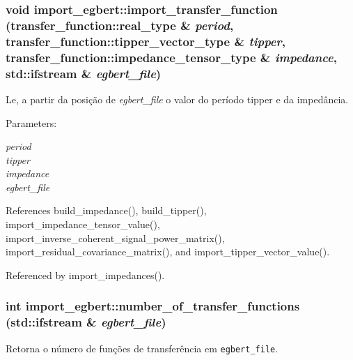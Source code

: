 \subsubsection{\setlength{\rightskip}{0pt plus 5cm}void import\_\-egbert::import\_\-transfer\_\-function ({\bf transfer\_\-function::real\_\-type} \& {\em period}, \/  transfer\_\-function::tipper\_\-vector\_\-type \& {\em tipper}, \/  transfer\_\-function::impedance\_\-tensor\_\-type \& {\em impedance}, \/  std::ifstream \& {\em egbert\_\-file})}\label{namespaceimport__egbert_858364616f0e9b1625aca340615a84d4}


Le, a partir da posição de {\em egbert\_\-file\/} o valor do período tipper e da impedância. 

\begin{Desc}
\item[Parameters:]
\begin{description}
\item[{\em period}]\item[{\em tipper}]\item[{\em impedance}]\item[{\em egbert\_\-file}]\end{description}
\end{Desc}


References build\_\-impedance(), build\_\-tipper(), import\_\-impedance\_\-tensor\_\-value(), import\_\-inverse\_\-coherent\_\-signal\_\-power\_\-matrix(), import\_\-residual\_\-covariance\_\-matrix(), and import\_\-tipper\_\-vector\_\-value().

Referenced by import\_\-impedances().
\subsubsection{\setlength{\rightskip}{0pt plus 5cm}int import\_\-egbert::number\_\-of\_\-transfer\_\-functions (std::ifstream \& {\em egbert\_\-file})}\label{namespaceimport__egbert_2862bf965204af7755d63bdc23833c8b}


Retorna o número de funções de transferência em {\tt egbert\_\-file}. 

